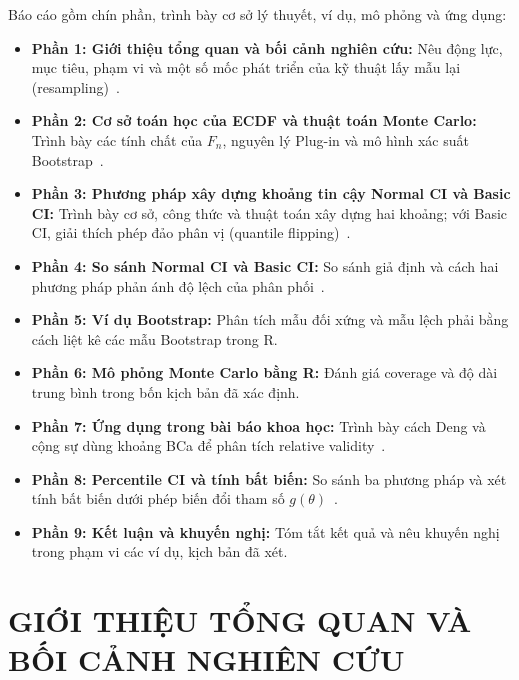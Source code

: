 \documentclass[12pt,a4paper]{article}
\theoremstyle{definition}
\numberwithin{equation}{section}
\begin{document}
	Báo cáo gồm chín phần, trình bày cơ sở lý thuyết, ví dụ, mô phỏng và ứng dụng:
	\begin{itemize}
		\item \textbf{Phần 1: Giới thiệu tổng quan và bối cảnh nghiên cứu:} Nêu động lực, mục tiêu, phạm vi và một số mốc phát triển của kỹ thuật lấy mẫu lại (resampling)~\cite{efron1979}.
		\item \textbf{Phần 2: Cơ sở toán học của ECDF và thuật toán Monte Carlo:} Trình bày các tính chất của $F_n$, nguyên lý Plug-in và mô hình xác suất Bootstrap~\cite{buithuytrang2026,rizzo2019}.
		\item \textbf{Phần 3: Phương pháp xây dựng khoảng tin cậy Normal CI và Basic CI:} Trình bày cơ sở, công thức và thuật toán xây dựng hai khoảng; với Basic CI, giải thích phép đảo phân vị (quantile flipping)~\cite{rizzo2019,efron1993}.
		\item \textbf{Phần 4: So sánh Normal CI và Basic CI:} So sánh giả định và cách hai phương pháp phản ánh độ lệch của phân phối~\cite{davison1997}.
		\item \textbf{Phần 5: Ví dụ Bootstrap:} Phân tích mẫu đối xứng và mẫu lệch phải bằng cách liệt kê các mẫu Bootstrap trong R.
		\item \textbf{Phần 6: Mô phỏng Monte Carlo bằng R:} Đánh giá coverage và độ dài trung bình trong bốn kịch bản đã xác định.
		\item \textbf{Phần 7: Ứng dụng trong bài báo khoa học:} Trình bày cách Deng và cộng sự dùng khoảng BCa để phân tích relative validity~\cite{deng2013}.
		\item \textbf{Phần 8: Percentile CI và tính bất biến:} So sánh ba phương pháp và xét tính bất biến dưới phép biến đổi tham số $g(\theta)$~\cite{efron1993}.
		\item \textbf{Phần 9: Kết luận và khuyến nghị:} Tóm tắt kết quả và nêu khuyến nghị trong phạm vi các ví dụ, kịch bản đã xét.
	\end{itemize}

	\newpage

	\renewcommand{\contentsname}{\Large\bfseries MỤC LỤC}
	\tableofcontents

	\newpage
	\setcounter{page}{1}


	\section{GIỚI THIỆU TỔNG QUAN VÀ BỐI CẢNH NGHIÊN CỨU}
\end{document}
